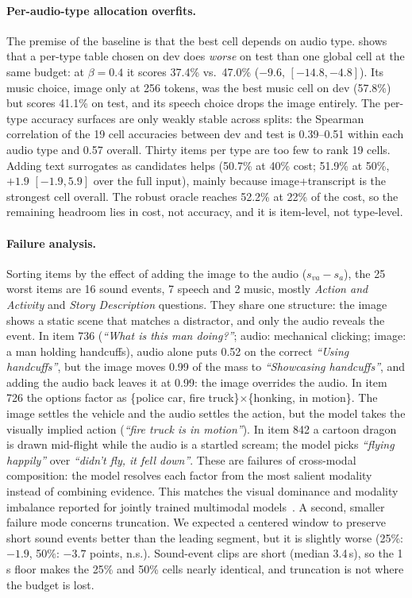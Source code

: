 \paragraph{Per-audio-type allocation overfits.} The premise of the baseline
is that the best cell depends on audio type.  shows
that a per-type table chosen on dev does \emph{worse} on test than one global
cell at the same budget: at $\beta=0.4$ it scores 37.4\% vs.\ 47.0\%
($-9.6$, $[-14.8,-4.8]$). Its music choice, image only at 256 tokens, was
the best music cell on dev (57.8\%) but scores 41.1\% on test, and its speech
choice drops the image entirely. The per-type accuracy surfaces are only
weakly stable across splits: the Spearman correlation of the 19 cell
accuracies between dev and test is 0.39--0.51 within each audio type and 0.57
overall. Thirty items per type are too few to rank 19 cells. Adding text
surrogates as candidates helps (50.7\% at 40\% cost; 51.9\% at 50\%, $+1.9$
$[-1.9,5.9]$ over the full input), mainly because image+transcript is the
strongest cell overall. The robust oracle reaches 52.2\% at 22\% of the cost,
so the remaining headroom lies in cost, not accuracy, and it is item-level, not
type-level.

\paragraph{Failure analysis.} Sorting items by the effect of adding the
image to the audio ($s_{va}-s_a$), the 25 worst items are 16 sound events, 7
speech and 2 music, mostly \emph{Action and Activity} and \emph{Story
Description} questions. They share one structure: the image shows a static
scene that matches a distractor, and only the audio reveals the event. In
item 736 (\emph{``What is this man doing?''}; audio: mechanical clicking;
image: a man holding handcuffs), audio alone puts 0.52 on the correct
\emph{``Using handcuffs''}, but the image moves 0.99 of the mass to
\emph{``Showcasing handcuffs''}, and adding the audio back leaves it at 0.99:
the image overrides the audio. In item 726 the options factor as
\{police car, fire truck\}$\times$\{honking, in motion\}. The image settles
the vehicle and the audio settles the action, but the model takes the
visually implied action (\emph{``fire truck is in motion''}). In item 842 a
cartoon dragon is drawn mid-flight while the audio is a startled scream; the
model picks \emph{``flying happily''} over \emph{``didn't fly, it fell
down''}. These are failures of cross-modal composition: the model resolves
each factor from the most salient modality instead of combining evidence. This
matches the visual dominance and modality imbalance reported for jointly
trained multimodal models~\citep{wu2022greedy,peng2022ogm}. A second, smaller
failure mode concerns truncation. We expected a centered window to preserve
short sound events better than the leading segment, but it is slightly worse
(25\%: $-1.9$, 50\%: $-3.7$ points, n.s.). Sound-event clips are short (median
3.4\,s), so the 1\,s floor makes the 25\% and 50\% cells nearly identical, and
truncation is not where the budget is lost.

